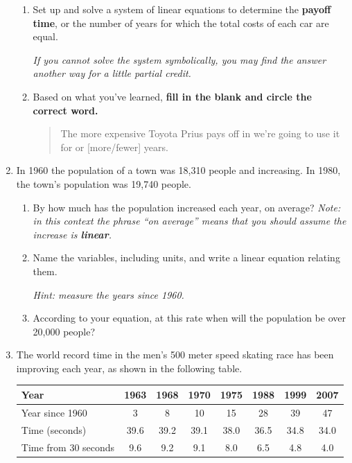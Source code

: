 \documentclass[12pt]{article}
\begin{document}
\begin{enumerate}
\begin{enumerate}
\item Set up and solve a system of linear equations to determine the \textbf{payoff time}, or the number of years for which the total costs of each car are equal.

\emph{If you cannot solve the system symbolically, you may find the answer another way for a little partial credit.}
\vfill

\item Based on what you've learned, \textbf{fill in the blank and circle the correct word.}

\begin{quote}
The more expensive Toyota Prius pays off in we're going to use it for \hrulefill   or [more/fewer] years.  
\end{quote}

\end{enumerate}
\newpage



\item In 1960 the population of a town was 18,310 people and increasing.  In 1980, the town's population was 19,740 people.

\begin{enumerate}
\item By how much has the population increased each year, on average?  \emph{Note:  in this context the phrase ``on average'' means that you should assume the increase is \textbf{linear}.}
\vfill
\item Name the variables, including units, and write a linear equation relating them.

\emph{Hint:  measure the years since 1960.}
\vfill
\item According to your equation, at this rate when will the population be over 20,000 people?
\vfill
\end{enumerate}

\newpage %
\item The world record time in the men's 500 meter speed skating race has been improving each year, as shown in the following table.

\begin{center}
\begin{tabular} {|l|c|c |c|c|c|c|c|}  \hline
Year & 1963 & 1968 & 1970 & 1975 & 1988 & 1999 & 2007  \\ \hline
Year since 1960 & 3 & 8 & 10 & 15 & 28 & 39 & 47  \\ \hline
Time (seconds) & 39.6 & 39.2 & 39.1 & 38.0 & 36.5 & 34.8 & 34.0  \\ \hline
Time from 30 seconds & 9.6 & 9.2 & 9.1 & 8.0 & 6.5 & 4.8 & 4.0  \\ \hline
\end{tabular}
\end{center}


\end{enumerate}
\end{document}
